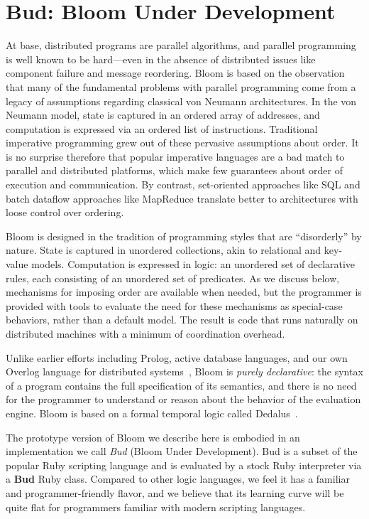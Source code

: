 \section{Bud: Bloom Under Development}
\label{sec:lang}
At base, distributed programs are parallel algorithms, and parallel programming is well known to be hard---even in the absence of distributed issues like component failure and message reordering.  Bloom is based on the observation that many of the fundamental problems with parallel programming come from a legacy of assumptions regarding classical von Neumann architectures.  In the von Neumann model, state is captured in an ordered array of addresses, and computation is expressed via an ordered list of instructions.  Traditional imperative programming grew out of these pervasive assumptions about order.  It is no surprise therefore that popular imperative languages are a bad match to parallel and distributed platforms, which make few guarantees about order of execution and communication. By contrast, set-oriented approaches like SQL and batch dataflow approaches like MapReduce translate better to architectures with loose control over ordering.

Bloom is designed in the tradition of programming styles that are ``disorderly'' by nature.  State is captured in unordered collections, akin to relational and key-value models.  Computation is expressed in logic: an unordered set of declarative rules, each consisting of an unordered set of predicates.  As we discuss below, mechanisms for imposing order are available when needed, but the programmer is provided with tools to evaluate the need for these mechanisms as special-case behaviors, rather than a default model.  The result is code that runs naturally on distributed machines with a minimum of coordination overhead.
 
Unlike earlier efforts including Prolog, active database languages,
and our own Overlog language for distributed systems~\cite{p2}, Bloom is {\em purely declarative}: the syntax of a program contains the full specification of its semantics, and there is no need for the programmer to understand or reason about the behavior of the evaluation engine.  Bloom is based on a formal temporal logic called Dedalus~\cite{dedalus-techr}.

The prototype version of Bloom we describe here is embodied in an implementation we call {\em Bud} (Bloom Under Development).  Bud is a subset of the popular Ruby scripting language and is evaluated by a stock Ruby interpreter via a \textbf{Bud} Ruby class.  Compared to other logic languages, we feel it has a familiar and programmer-friendly flavor, and we believe that its learning curve will be quite flat for programmers familiar with modern scripting languages.

